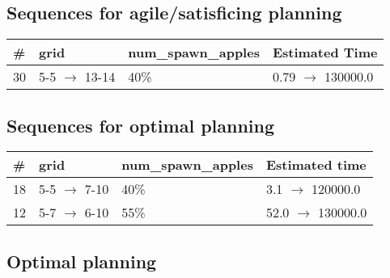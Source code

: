 \documentclass{article}
\begin{document}
                         \subsection*{Sequences for agile/satisficing planning}

                        \begin{center}
                        \begin{tabular}{@{}l|l|l|l@{}}
                        \# & grid & num\_spawn\_apples & Estimated Time\\\midrule
                        30&5-5 $\rightarrow$ 13-14&40\%&0.79 $\rightarrow$ 130000.0
                        \end{tabular}
                        \end{center}
                    
                            \subsection*{Sequences for optimal planning}

                            \begin{center}
                            \begin{tabular}{@{}l|l|l|l@{}}
                            \# & grid & num\_spawn\_apples & Estimated time\\\midrule
                            18&5-5 $\rightarrow$ 7-10&40\%&3.1 $\rightarrow$ 120000.0\\
12&5-7 $\rightarrow$ 6-10&55\%&52.0 $\rightarrow$ 130000.0
                            \end{tabular}
                            \end{center}
                    
                                \subsection*{Optimal planning}
                                
\end{document}
